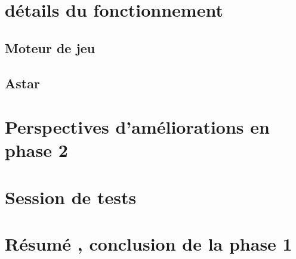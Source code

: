 \documentclass{article}
\begin{document}
	\section{détails du fonctionnement}
		\subsection{Moteur de jeu}
		\subsection{Astar}
		\newpage
	\section{Perspectives d'améliorations en phase 2}
	\newpage
	\section{Session de tests}
	\newpage
	\section{Résumé , conclusion de la phase 1}
	


		

\newpage
\end{document}
